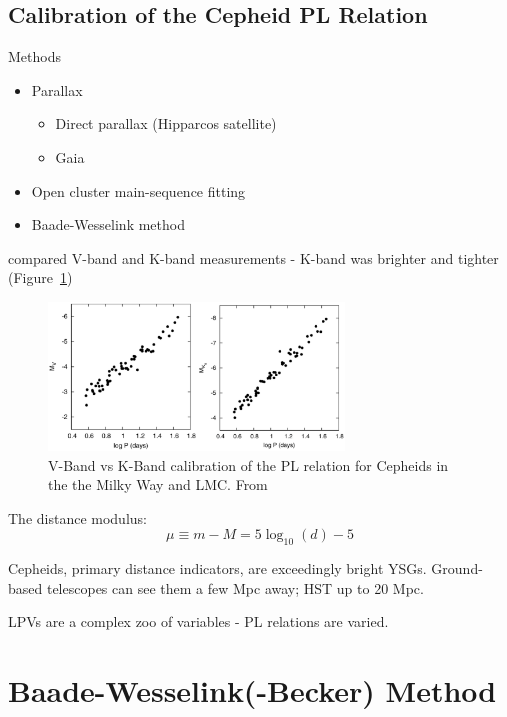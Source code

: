 \documentclass{spy}
\begin{document}
\subsection{Calibration of the Cepheid PL Relation}
Methods
\begin{itemize}
    \item Parallax
        \begin{itemize}
        \item Direct parallax (Hipparcos satellite)
        \item Gaia
        \end{itemize}
    \item Open cluster main-sequence fitting
    \item Baade-Wesselink method
\end{itemize}

\citet{fouqueNewCalibrationGalactic2007} compared V-band and K-band measurements - K-band was brighter and tighter (Figure~\ref{fouque_cepheid})

\begin{figure}[ht]
    \centering
    \includegraphics[width=0.7\textwidth]{fouque_cepheid.eps}
    \caption{V-Band vs K-Band calibration of the PL relation for Cepheids in the the Milky Way and LMC. From \citet{fouqueNewCalibrationGalactic2007}}   
    \label{fouque_cepheid}
\end{figure}

The distance modulus:
\begin{equation}
\mu \equiv m-M = 5\log_\mathrm{10}(d) - 5
\end{equation}

Cepheids, primary distance indicators, are exceedingly bright YSGs. Ground-based telescopes can see them a few Mpc away; HST up to 20 Mpc. 

LPVs are a complex zoo of variables - PL relations are varied. 

\section{Baade-Wesselink(-Becker) Method}
\end{document}
